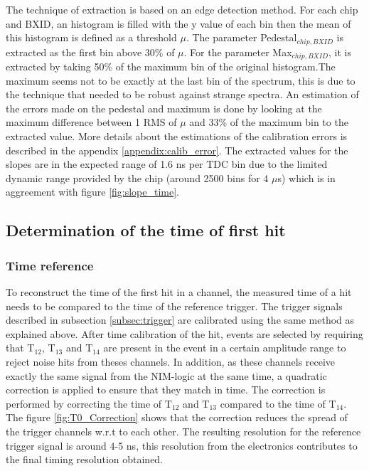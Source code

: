 The technique of extraction is based on an edge detection method. For each chip and BXID, an histogram is filled with the y value of each bin then the mean of this histogram is defined as a threshold $\mu$. The parameter Pedestal$_{chip, BXID}$ is extracted as the first bin above 30\% of $\mu$. For the parameter Max$_{chip, BXID}$, it is extracted by taking 50\% of the maximum bin of the original histogram.The maximum seems not to be exactly at the last bin of the spectrum, this is due to the technique that needed to be robust against strange spectra. An estimation of the errors made on the pedestal and maximum is done by looking at the maximum difference between 1 RMS of $\mu$ and 33\% of the maximum bin to the extracted value. More details about the estimations of the calibration errors is described in the appendix \ref{appendix:calib_error}. The extracted values for the slopes are in the expected range of 1.6 ns per TDC bin due to the limited dynamic range provided by the chip (around 2500 bins for 4 $\mu$s) which is in aggreement with figure \ref{fig:slope_time}.

\subsection{Determination of the time of first hit}

\subsubsection{Time reference}
\label{subsection:time_ref}
To reconstruct the time of the first hit in a channel, the measured time of a hit needs to be compared to the time of the reference trigger. The trigger signals described in subsection \ref{subsec:trigger} are calibrated using the same method as explained above. After time calibration of the hit, events are selected by requiring that T$_{12}$, T$_{13}$ and T$_{14}$ are present in the event in a certain amplitude range to reject noise hits from theses channels. In addition, as these channels receive exactly the same signal from the NIM-logic at the same time, a quadratic correction is applied to ensure that they match in time. The correction is performed by correcting the time of T$_{12}$ and T$_{13}$ compared to the time of T$_{14}$. The figure \ref{fig:T0_Correction} shows that the correction reduces the spread of the trigger channels w.r.t to each other. The resulting resolution for the reference trigger signal is around 4-5 ns, this resolution from the electronics contributes to the final timing resolution obtained.


